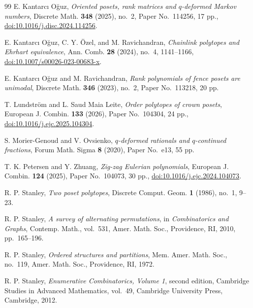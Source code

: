 \documentclass[11pt,letterpaper,reqno]{amsart}
\theoremstyle{definition}
\begin{document}
\begin{thebibliography}{99}
E. Kantarc{\i} O\u{g}uz,
\emph{Oriented posets, rank matrices and \(q\)-deformed Markov numbers},
Discrete Math. \textbf{348} (2025), no.~2, Paper No.~114256, 17 pp.,
\href{https://doi.org/10.1016/j.disc.2024.114256}{doi:10.1016/j.disc.2024.114256}.

E. Kantarc{\i} O\u{g}uz, C. Y. \"Ozel, and M. Ravichandran,
\emph{Chainlink polytopes and Ehrhart equivalence},
Ann. Comb. \textbf{28} (2024), no.~4, 1141--1166,
\href{https://doi.org/10.1007/s00026-023-00683-x}{doi:10.1007/s00026-023-00683-x}.

E. Kantarc{\i} O\u{g}uz and M. Ravichandran,
\emph{Rank polynomials of fence posets are unimodal},
Discrete Math. \textbf{346} (2023), no.~2, Paper No.~113218, 20 pp.

T. Lundstr\"om and L. Saud Maia Leite,
\emph{Order polytopes of crown posets},
European J. Combin. \textbf{133} (2026), Paper No.~104304, 24 pp.,
\href{https://doi.org/10.1016/j.ejc.2025.104304}{doi:10.1016/j.ejc.2025.104304}.

S. Morier-Genoud and V. Ovsienko,
\emph{\(q\)-deformed rationals and \(q\)-continued fractions},
Forum Math. Sigma \textbf{8} (2020), Paper No.~e13, 55 pp.

T. K. Petersen and Y. Zhuang,
\emph{Zig-zag Eulerian polynomials},
European J. Combin. \textbf{124} (2025), Paper No.~104073, 30 pp.,
\href{https://doi.org/10.1016/j.ejc.2024.104073}{doi:10.1016/j.ejc.2024.104073}.

R. P. Stanley,
\emph{Two poset polytopes},
Discrete Comput. Geom. \textbf{1} (1986), no.~1, 9--23.

R. P. Stanley,
\emph{A survey of alternating permutations},
in \emph{Combinatorics and Graphs},
Contemp. Math., vol.~531,
Amer. Math. Soc., Providence, RI, 2010, pp.~165--196.

R. P. Stanley,
\emph{Ordered structures and partitions},
Mem. Amer. Math. Soc., no.~119,
Amer. Math. Soc., Providence, RI, 1972.

R. P. Stanley,
\emph{Enumerative Combinatorics, Volume 1},
second edition,
Cambridge Studies in Advanced Mathematics, vol.~49,
Cambridge University Press, Cambridge, 2012.

\end{thebibliography}
\end{document}
